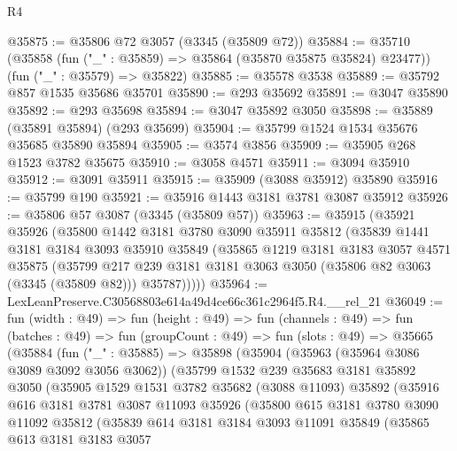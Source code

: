 \begin{lexlean}{R4}
\begin{coremodule}
@35875 := @35806 @72 @3057 (@3345 (@35809 @72))
@35884 := @35710
    (@35858 (fun ("_" : @35859) => @35864 (@35870 @35875 @35824) @23477))
    (fun ("_" : @35579) => @35822)
@35885 := @35578 @3538
@35889 := @35792 @857 @1535 @35686 @35701
@35890 := @293 @35692
@35891 := @3047 @35890
@35892 := @293 @35698
@35894 := @3047 @35892 @3050
@35898 := @35889 (@35891 @35894) (@293 @35699)
@35904 := @35799 @1524 @1534 @35676 @35685 @35890 @35894
@35905 := @3574 @3856
@35909 := @35905 @268 @1523 @3782 @35675
@35910 := @3058 @4571
@35911 := @3094 @35910
@35912 := @3091 @35911
@35915 := @35909 (@3088 @35912) @35890
@35916 := @35799 @190
@35921 := @35916 @1443 @3181 @3781 @3087 @35912
@35926 := @35806 @57 @3087 (@3345 (@35809 @57))
@35963 := @35915
    (@35921
      @35926
      (@35800
        @1442
        @3181
        @3780
        @3090
        @35911
        @35812
        (@35839
          @1441
          @3181
          @3184
          @3093
          @35910
          @35849
          (@35865
            @1219
            @3181
            @3183
            @3057
            @4571
            @35875
            (@35799
              @217
              @239
              @3181
              @3181
              @3063
              @3050
              (@35806 @82 @3063 (@3345 (@35809 @82)))
              @35787)))))
@35964 := LexLeanPreserve.C30568803e614a49d4ce66c361c2964f5.R4.__rel_21
@36049 := fun (width : @49) =>
  fun (height : @49) =>
  fun (channels : @49) =>
  fun (batches : @49) =>
  fun (groupCount : @49) =>
  fun (slots : @49) =>
  @35665
    (@35884
      (fun ("_" : @35885) =>
      @35898
        (@35904
          (@35963 (@35964 @3086 @3089 @3092 @3056 @3062))
          (@35799
            @1532
            @239
            @35683
            @3181
            @35892
            @3050
            (@35905
              @1529
              @1531
              @3782
              @35682
              (@3088 @11093)
              @35892
              (@35916
                @616
                @3181
                @3781
                @3087
                @11093
                @35926
                (@35800
                  @615
                  @3181
                  @3780
                  @3090
                  @11092
                  @35812
                  (@35839
                    @614
                    @3181
                    @3184
                    @3093
                    @11091
                    @35849
                    (@35865
                      @613
                      @3181
                      @3183
                      @3057

\end{coremodule}
\end{lexlean}

